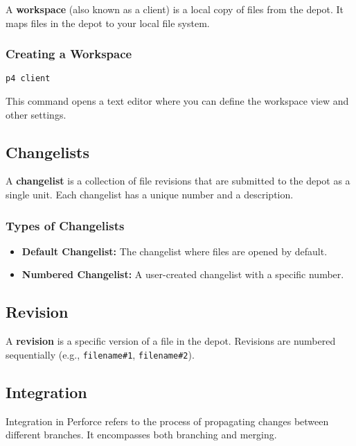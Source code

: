 \documentclass{article}
\begin{document}
A \textbf{workspace} (also known as a client) is a local copy of files from the depot. It maps files in the depot to your local file system.

\subsubsection*{Creating a Workspace}

\begin{lstlisting}[style=bash]
p4 client
\end{lstlisting}

This command opens a text editor where you can define the workspace view and other settings.

\subsection{Changelists}

A \textbf{changelist} is a collection of file revisions that are submitted to the depot as a single unit. Each changelist has a unique number and a description.

\subsubsection*{Types of Changelists}

\begin{itemize}
    \item \textbf{Default Changelist:} The changelist where files are opened by default.
    \item \textbf{Numbered Changelist:} A user-created changelist with a specific number.
\end{itemize}

\subsection{Revision}

A \textbf{revision} is a specific version of a file in the depot. Revisions are numbered sequentially (e.g., \texttt{filename\#1}, \texttt{filename\#2}).

\subsection{Integration}

Integration in Perforce refers to the process of propagating changes between different branches. It encompasses both branching and merging.
\end{document}
